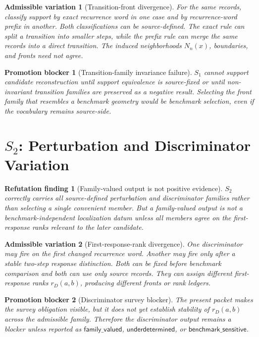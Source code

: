 \documentclass[11pt]{article}
\newtheorem{finding}{Refutation finding}
\newtheorem{variation}{Admissible variation}
\newtheorem{blocker}{Promotion blocker}
\begin{document}
\begin{variation}[Transition-front divergence]
For the same records, classify support by exact recurrence word in one case
and by recurrence-word prefix in another. Both classifications can be
source-defined. The exact rule can split a transition into smaller steps,
while the prefix rule can merge the same records into a direct transition.
The induced neighborhoods \(N_n(x)\), boundaries, and fronts need not agree.
\end{variation}

\begin{blocker}[Transition-family invariance failure]
\(S_1\) cannot support candidate reconstruction until support equivalence is
source-fixed or until non-invariant transition families are preserved as a
negative result. Selecting the front family that resembles a benchmark
geometry would be benchmark selection, even if the vocabulary remains
source-side.
\end{blocker}

\section{\texorpdfstring{\(S_2\)}{S2}: Perturbation and Discriminator Variation}

\begin{finding}[Family-valued output is not positive evidence]
\(S_2\) correctly carries all source-defined perturbation and discriminator
families rather than selecting a single convenient member. But a family-valued
output is not a benchmark-independent localization datum unless all members
agree on the first-response ranks relevant to the later candidate.
\end{finding}

\begin{variation}[First-response-rank divergence]
One discriminator may fire on the first changed recurrence word. Another may
fire only after a stable two-step response distinction. Both can be fixed
before benchmark comparison and both can use only source records. They can
assign different first-response ranks \(r_D(a,b)\), producing different
fronts or rank ledgers.
\end{variation}

\begin{blocker}[Discriminator survey blocker]
The present packet makes the survey obligation visible, but it does not yet
establish stability of \(r_D(a,b)\) across the admissible family. Therefore
the discriminator output remains a blocker unless reported as
\(\mathsf{family\_valued}\), \(\mathsf{underdetermined}\), or
\(\mathsf{benchmark\_sensitive}\).
\end{blocker}
\end{document}
